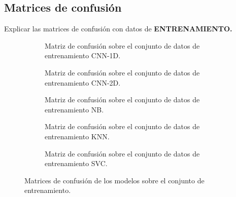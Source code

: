   \subsection{Matrices de confusión}

    Explicar las matrices de confusión con datos de \textbf{ENTRENAMIENTO.}

    \begin{figure}
        \centering
        \begin{subfigure}[b]{0.4\textwidth}
            \centering
            
            \caption{Matriz de confusión sobre el conjunto de datos de entrenamiento CNN-1D.}
            \label{ConfusionMatrixTrainImages:1D}
        \end{subfigure}
        \begin{subfigure}[b]{0.4\textwidth}
            \centering
            
            \caption{Matriz de confusión sobre el conjunto de datos de entrenamiento CNN-2D.} 
            \label{ConfusionMatrixTrainImages:2D}

        \end{subfigure}
        \begin{subfigure}[b]{0.4\textwidth}
            \centering
            
            \caption{Matriz de confusión sobre el conjunto de datos de entrenamiento NB.}
            \label{ConfusionMatrixTrainImages:NB}
        \end{subfigure}

        \begin{subfigure}[b]{0.4\textwidth}
            \centering
            
            \caption{Matriz de confusión sobre el conjunto de datos de entrenamiento KNN.}
            \label{ConfusionMatrixTrainImages:KNN}
        \end{subfigure}

        \begin{subfigure}[b]{0.4\textwidth}
            \centering
            
            \caption{Matriz de confusión sobre el conjunto de datos de entrenamiento SVC.}
            \label{ConfusionMatrixTrainImages:SVC}
        \end{subfigure}

        \caption{Matrices de confusión de los modelos sobre el conjunto de entrenamiento.}
        \label{ConfusionMatrixTrainImages}
     \end{figure}

